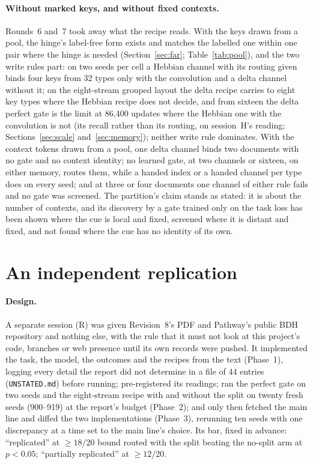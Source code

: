 \documentclass[11pt]{article}
\begin{document}
\paragraph{Without marked keys, and without fixed contexts.} Rounds~6 and~7 took away what the recipe reads. With the keys drawn from a pool, the hinge's label-free form exists and matches the labelled one within one pair where the hinge is needed (Section~\ref{sec:far}; Table~\ref{tab:pool}), and the two write rules part: on two seeds per cell a Hebbian channel with its routing given binds four keys from 32 types only with the convolution and a delta channel without it; on the eight-stream grouped layout the delta recipe carries to eight key types where the Hebbian recipe does not decide, and from sixteen the delta perfect gate is the limit at 86{,}400 updates where the Hebbian one with the convolution is not (its recall rather than its routing, on session~H's reading; Sections~\ref{sec:scale} and~\ref{sec:memory}); neither write rule dominates. With the context tokens drawn from a pool, one delta channel binds two documents with no gate and no context identity; no learned gate, at two channels or sixteen, on either memory, routes them, while a handed index or a handed channel per type does on every seed; and at three or four documents one channel of either rule fails and no gate was screened. The partition's claim stands as stated: it is about the number of contexts, and its discovery by a gate trained only on the task loss has been shown where the cue is local and fixed, screened where it is distant and fixed, and not found where the cue has no identity of its own.

\section{An independent replication}
\label{sec:replication}

\paragraph{Design.} A separate session (R) was given Revision~8's PDF and Pathway's public BDH repository and nothing else, with the rule that it must not look at this project's code, branches or web presence until its own records were pushed. It implemented the task, the model, the outcomes and the recipes from the text (Phase~1), logging every detail the report did not determine in a file of 44 entries (\texttt{UNSTATED.md}) before running; pre-registered its readings; ran the perfect gate on two seeds and the eight-stream recipe with and without the split on twenty fresh seeds (900--919) at the report's budget (Phase~2); and only then fetched the main line and diffed the two implementations (Phase~3), rerunning ten seeds with one discrepancy at a time set to the main line's choice. Its bar, fixed in advance: ``replicated'' at $\geq 18/20$ bound routed with the split beating the no-split arm at $p < 0.05$; ``partially replicated'' at $\geq 12/20$.
\end{document}
